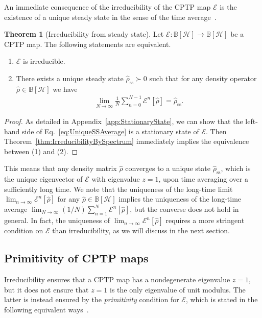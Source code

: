 \documentclass[preprint,pteplogo]{ptephy_v2}%
\numberwithin{equation}{section}
\theoremstyle{definition}
\newtheorem{theorem}{Theorem}
\newcommand{\mc}[1]{\mathcal{#1}}
\newcommand{\mbb}[1]{\mathbb{#1}}
\begin{document}
An immediate consequence of the irreducibility of the CPTP map $\mc{E}$ is the existence of a unique steady state in the sense of the time average~\cite{wolf2012quantum}.
\begin{theorem}[Irreducibility from steady state]
Let $\mc{E}: \mbb{B}[\mc{H}] \to \mbb{B}[\mc{H}]$ be a CPTP map. 
The following statements are equivalent.
\begin{enumerate}
\item $\mc{E}$ is irreducible.
\item There exists a unique steady state $\hat{\rho}_\mathrm{ss} \succ 0$ such that for any density operator $\hat{\rho} \in \mbb{B}[\mc{H}]$ we have
\begin{align} \label{eq:UniqueSSAverage}
\lim_{N \to \infty} \frac{1}{N} \sum_{n=0}^{N-1} \mc{E}^n[\hat{\rho}] = \hat{\rho}_\mathrm{ss}.
\end{align}
\end{enumerate}
\end{theorem}

\begin{proof}
As detailed in Appendix~\ref{app:StationaryState}, we can show that the left-hand side of Eq.~\eqref{eq:UniqueSSAverage} is a stationary state of $\mc{E}$.
Then Theorem~\ref{thm:IrreducibilityBySpectrum} immediately implies the equivalence between (1) and (2).
\end{proof}

This means that any density matrix $\hat{\rho}$ converges to a unique state $\hat{\rho}_\mathrm{ss}$, which is the unique eigenvector of $\mc{E}$ with eigenvalue $z=1$, upon time averaging over a sufficiently long time.
We note that the uniqueness of the long-time limit $\lim_{n \to \infty} \mc{E}^n[\hat{\rho}]$ for any $\hat{\rho} \in \mbb{B}[\mc{H}]$ implies the uniqueness of the long-time average $\lim_{N \to \infty} (1/N) \sum_{n=1}^N \mc{E}^n [\hat{\rho}]$, but the converse does not hold in general.
In fact, the uniqueness of $\lim_{n \to \infty} \mc{E}^n[\hat{\rho}]$ requires a more stringent condition on $\mc{E}$ than irreducibility, as we will discuss in the next section.


\subsection{Primitivity of CPTP maps}
\label{sec:primitivity}

Irreducibility ensures that a CPTP map has a nondegenerate eigenvalue $z=1$, but it does not ensure that $z=1$ is the only eigenvalue of unit modulus.
The latter is instead ensured by the \emph{primitivity} condition for $\mc{E}$, which is stated in the following equivalent ways~\cite{evans1978spectral, sanz2010quantum, wolf2012quantum}.
\end{document}
